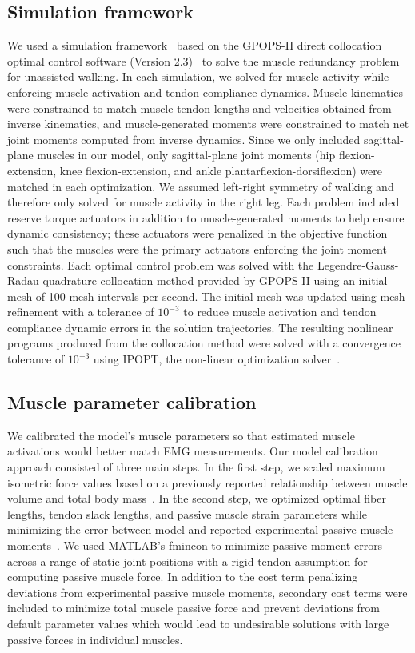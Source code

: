 \documentclass[10pt,letterpaper]{article}
\begin{document}
\subsection*{Simulation framework}
We used a simulation framework~\cite{DeGroote:2016} based on the GPOPS-II direct collocation optimal control software (Version 2.3)~\cite{Patterson:2014} to solve the muscle redundancy problem for unassisted walking. In each simulation, we solved for muscle activity while enforcing muscle activation and tendon compliance dynamics. Muscle kinematics were constrained to match muscle-tendon lengths and velocities obtained from inverse kinematics, and muscle-generated moments were constrained to match net joint moments computed from inverse dynamics. Since we only included sagittal-plane muscles in our model, only sagittal-plane joint moments (hip flexion-extension, knee flexion-extension, and ankle plantarflexion-dorsiflexion) were matched in each optimization. We assumed left-right symmetry of walking and therefore only solved for muscle activity in the right leg. Each problem included reserve torque actuators in addition to muscle-generated moments to help ensure dynamic consistency; these actuators were penalized in the objective function such that the muscles were the primary actuators enforcing the joint moment constraints. Each optimal control problem was solved with the Legendre-Gauss-Radau quadrature collocation method provided by GPOPS-II using an initial mesh of 100 mesh intervals per second. The initial mesh was updated using mesh refinement with a tolerance of $10^{-3}$ to reduce muscle activation and tendon compliance dynamic errors in the solution trajectories. The resulting nonlinear programs produced from the collocation method were solved with a convergence tolerance of $10^{-3}$ using IPOPT, the non-linear optimization solver~\cite{Wachter:2006}.

\subsection*{Muscle parameter calibration}
We calibrated the model's muscle parameters so that estimated muscle activations would better match EMG measurements. Our model calibration approach consisted of three main steps. In the first step, we scaled maximum isometric force values based on a previously reported relationship between muscle volume and total body mass~\cite{Handsfield:2014}. In the second step, we optimized optimal fiber lengths, tendon slack lengths, and passive muscle strain parameters while minimizing the error between model and reported experimental passive muscle moments~\cite{Silder:2007}. We used MATLAB's fmincon to minimize passive moment errors across a range of static joint positions with a rigid-tendon assumption for computing passive muscle force. In addition to the cost term penalizing deviations from experimental passive muscle moments, secondary cost terms were included to minimize total muscle passive force and prevent deviations from default parameter values which would lead to undesirable solutions with large passive forces in individual muscles.
\end{document}
